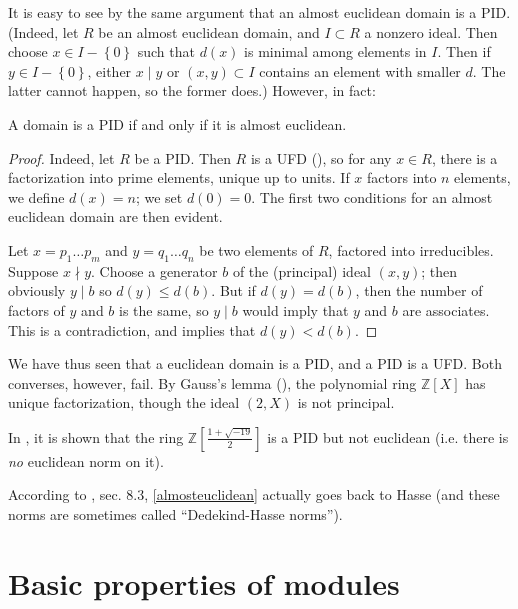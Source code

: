 It is easy to see by the same argument that an almost euclidean domain is a PID.
(Indeed, let $R$ be an almost euclidean domain, and $I \subset R$ a nonzero
ideal. Then choose $x \in I - \left\{0\right\}$ such that $d(x)$ is minimal among elements in
$I$. Then if $y \in I - \left\{0\right\}$, either $x \mid y$ or $(x,y) \subset I$ contains an
element with smaller $d$. The latter cannot happen, so the former does.)
However, in fact:
\begin{proposition} \label{almosteuclidean}
A domain is a PID if and only if it is almost euclidean.
\end{proposition} 
\begin{proof} 
Indeed, let $R$ be a PID. Then $R$ is a UFD (), so for any $x \in R$,
there is a factorization into prime elements, unique up to units. If $x$
factors into $n$ elements, we define $d(x)=n$; we set $d(0)=0$.
The first two conditions for an almost euclidean domain are then evident. 

Let $x = p_1 \dots p_m$ and $y = q_1 \dots q_n$ be two elements of $R$,
factored into irreducibles. Suppose $x \nmid y$. Choose a generator $b$ of the (principal) ideal $(x,y)$; then obviously $y
\mid b$ so $d(y) \leq d(b)$. But if $d(y) = d(b)$, then the
number of factors of $y$ and $b$ is the same, so  $y \mid b$ would imply
that $y$ and $b$ are associates. This is a contradiction, and implies that
$d(y)<d(b)$.

\end{proof} 


\begin{remark} 
We have thus seen that a euclidean domain is a PID, and a PID is a UFD. Both
converses, however, fail. By Gauss's lemma (\rref{}), the
polynomial ring $\mathbb{Z}[X]$ has unique factorization, though the ideal
$(2, X)$ is not principal. 

In \cite{Ca88}, it is shown that the ring $\mathbb{Z}[\frac{1+
\sqrt{-19}}{2}]$ is a PID but not euclidean (i.e. there is \emph{no} euclidean
norm on it).
\end{remark} 

According to \cite{Cl11}, sec. 8.3, \cref{almosteuclidean} actually goes back to Hasse
(and these norms are sometimes called ``Dedekind-Hasse norms'').

\section{Basic properties of modules}

